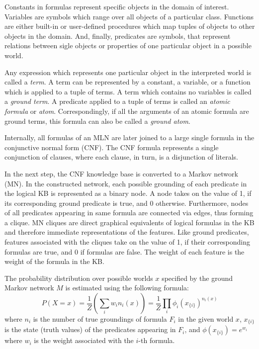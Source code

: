 \documentclass[a4paper,11pt]{article}
\begin{document}
Constants in formulas represent specific objects in the domain of interest.
Variables are symbols which range over all objects of a particular class.
Functions are either built-in or user-defined procedures which map tuples of
objects to other objects in the domain.  And, finally, predicates are symbols,
that represent relations between sigle objects or properties of one particular
object in a possible world.

Any expression which represents one particular object in the interpreted world
is called a \textit{term}.  A term can be represented by a constant, a
variable, or a function which is applied to a tuple of terms.  A term which
contains no variables is called a \textit{ground term}.  A predicate applied
to a tuple of terms is called an \textit{atomic formula} or \textit{atom}.
Correspondingly, if all the arguments of an atomic formula are ground terms,
this formula can also be called a \textit{ground atom}.

Internally, all formulas of an MLN are later joined to a large single formula
in the conjunctive normal form (CNF).  The CNF formula represents a single
conjunction of clauses, where each clause, in turn, is a disjunction of
literals.

In the next step, the CNF knowledge base is converted to a Markov network
(MN).  In the constructed network, each possible grounding of each predicate
in the logical KB is represented as a binary node.  A node takes on the value
of 1, if its corresponding ground predicate is true, and 0 otherwise.
Furthermore, nodes of all predicates appearing in same formula are connected
via edges, thus forming a clique.  MN cliques are direct graphical equivalents
of logical formulas in the KB and therefore immediate representations of the
features.  Like ground predicates, features associated with the cliques take
on the value of 1, if their corresponding formulas are true, and 0 if formulas
are false.  The weight of each feature is the weight of the formula in the KB.

The probability distribution over possible worlds $x$ specified by the ground
Markov network $M$ is estimated using the following formula:
\begin{equation}
  P(X=x) = \frac{1}{Z}\left(\sum_i{w_in_i(x)}\right) = %
    \frac{1}{Z}\prod_i{\phi_i(x_{\{i\}})^{n_i(x)}}
\end{equation}
where $n_i$ is the number of true groundings of formula $F_i$ in the given
world $x$, $x_{\{i\}}$ is the state (truth values) of the predicates appearing
in $F_i$, and $\phi(x_{\{i\}}) = e^{w_i}$ where $w_i$ is the weight associated
with the $i$-th formula.
\end{document}
